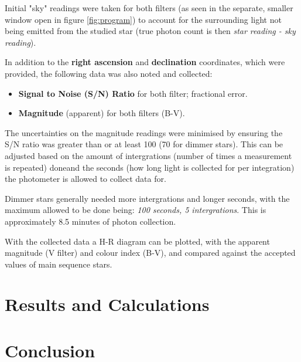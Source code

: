 \documentclass[12pt]{article}
\begin{document}
Initial "sky" readings were taken for both filters (as seen in the separate, smaller window open in figure \ref{fig:program}) to account for the surrounding light not being emitted
from the studied star (true photon count is then \textit{star reading - sky reading}).

In addition to the \textbf{right ascension} and \textbf{declination} coordinates, which were provided, the following data was also noted and collected:

\begin{itemize}
    \item \textbf{Signal to Noise (S/N) Ratio} for both filter; fractional error.
    \item \textbf{Magnitude} (apparent) for both filters (B-V).
\end{itemize}

The uncertainties on the magnitude readings were minimised by ensuring the S/N ratio was greater than or at least 100 (70 for dimmer stars). This can be adjusted based on the amount of intergrations 
(number of times a measurement is repeated) doneand the seconds (how long light is collected for per integration) the photometer is allowed to collect data for. 

Dimmer stars generally needed more intergrations and longer seconds, with the maximum allowed to be done being: \textit{100 seconds, 5 intergrations}. This is approximately 8.5 minutes of photon collection.

With the collected data a H-R diagram can be plotted, with the apparent magnitude (V filter) and colour index (B-V), and compared against the accepted values of main sequence stars.

\section{Results and Calculations} \label{sec:3}



\section{Conclusion} \label{sec:4}


\newpage



 \label{sec:ref}

\vspace{1.5cm}
\end{document}
